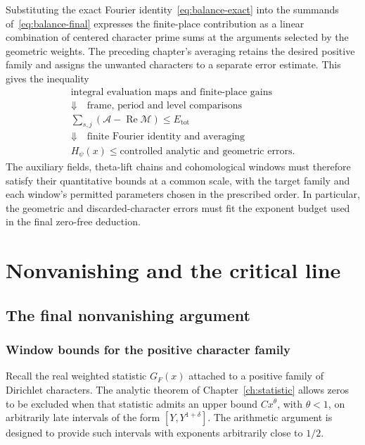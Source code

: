 \documentclass[11pt,openany,oneside]{scrbook}
\theoremstyle{definition}
\theoremstyle{remark}
\newcommand{\Rea}{\operatorname{Re}}
\begin{document}
Substituting the exact Fourier identity~\eqref{eq:balance-exact} into the summands of~\eqref{eq:balance-final} expresses the finite-place contribution as a linear combination of centered character prime sums at the arguments selected by the geometric weights. The preceding chapter's averaging retains the desired positive family and assigns the unwanted characters to a separate error estimate. This gives the inequality
\[
\begin{gathered}
\text{integral evaluation maps and finite-place gains}\\
\Downarrow\quad\text{frame, period and level comparisons}\\
\sum_{s,j}(\mathcal A-\Rea\mathcal M)\le E_{\mathrm{tot}}\\
\Downarrow\quad\text{finite Fourier identity and averaging}\\
H_\psi(x)\le \text{controlled analytic and geometric errors}.
\end{gathered}
\]
The auxiliary fields, theta-lift chains and cohomological windows must therefore satisfy their quantitative bounds at a common scale, with the target family and each window's permitted parameters chosen in the prescribed order. In particular, the geometric and discarded-character errors must fit the exponent budget used in the final zero-free deduction.

\part{Nonvanishing and the critical line}

\chapter{The final nonvanishing argument}\label{ch:assembly}

\section{Window bounds for the positive character family}
Recall the real weighted statistic $G_F(x)$ attached to a positive family of Dirichlet characters. The analytic theorem of Chapter~\ref{ch:statistic} allows zeros to be excluded when that statistic admits an upper bound $Cx^\theta$, with $\theta<1$, on arbitrarily late intervals of the form $[Y,Y^{1+\delta}]$. The arithmetic argument is designed to provide such intervals with exponents arbitrarily close to $1/2$.
\end{document}

